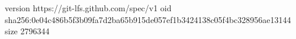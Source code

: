 version https://git-lfs.github.com/spec/v1
oid sha256:0e04c486b5f3b09fa7d2ba65b915de057ef1b3424138c05f4bc328956ae13144
size 2796344
